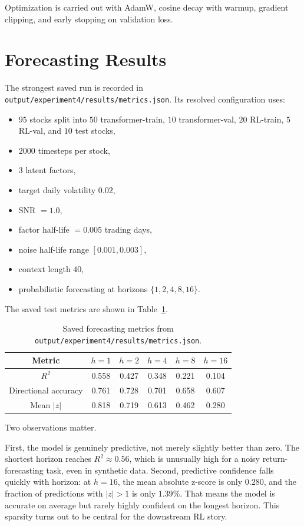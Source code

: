 \documentclass[11pt]{article}
\begin{document}
Optimization is carried out with AdamW, cosine decay with warmup, gradient clipping, and early stopping on validation loss.

\section{Forecasting Results}
The strongest saved run is recorded in \texttt{output/experiment4/results/metrics.json}. Its resolved configuration uses:
\begin{itemize}
\item \(95\) stocks split into \(50\) transformer-train, \(10\) transformer-val, \(20\) RL-train, \(5\) RL-val, and \(10\) test stocks,
\item \(2000\) timesteps per stock,
\item \(3\) latent factors,
\item target daily volatility \(0.02\),
\item SNR \(=1.0\),
\item factor half-life \(=0.005\) trading days,
\item noise half-life range \([0.001,0.003]\),
\item context length \(40\),
\item probabilistic forecasting at horizons \(\{1,2,4,8,16\}\).
\end{itemize}

The saved test metrics are shown in Table~\ref{tab:forecast}.

\begin{table}[h]
\centering
\begin{tabular}{cccccc}
\toprule
Metric & \(h=1\) & \(h=2\) & \(h=4\) & \(h=8\) & \(h=16\) \\
\midrule
\(R^2\) & 0.558 & 0.427 & 0.348 & 0.221 & 0.104 \\
Directional accuracy & 0.761 & 0.728 & 0.701 & 0.658 & 0.607 \\
Mean \(|z|\) & 0.818 & 0.719 & 0.613 & 0.462 & 0.280 \\
\bottomrule
\end{tabular}
\caption{Saved forecasting metrics from \texttt{output/experiment4/results/metrics.json}.}
\label{tab:forecast}
\end{table}

Two observations matter.

First, the model is genuinely predictive, not merely slightly better than zero. The shortest horizon reaches \(R^2 \approx 0.56\), which is unusually high for a noisy return-forecasting task, even in synthetic data. Second, predictive confidence falls quickly with horizon: at \(h=16\), the mean absolute z-score is only \(0.280\), and the fraction of predictions with \(|z|>1\) is only \(1.39\%\). That means the model is accurate on average but rarely highly confident on the longest horizon. This sparsity turns out to be central for the downstream RL story.
\end{document}
